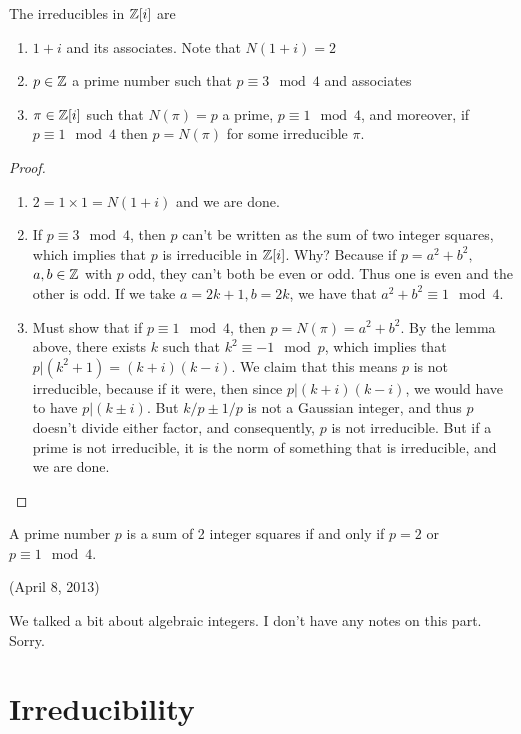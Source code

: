 \documentclass{../mathnotes}
\begin{document}
\begin{thm}
    The irreducibles in $\mathbb{Z}[i]$ are
    \begin{enumerate}
        \item $1+i$ and its associates. Note that $N(1+i)=2$
        \item $p\in\mathbb{Z}$ a prime number such that $p\equiv3\mod 4$ and associates
        \item $\pi\in\mathbb{Z}[i]$ such that $N(\pi)=p$ a prime, $p\equiv 1\mod 4$, and moreover, if $p\equiv 1\mod 4$
            then $p=N(\pi)$ for some irreducible $\pi$.
    \end{enumerate}
\end{thm}
\begin{proof}
    \begin{enumerate}
        \item $2=1\times 1=N(1+i)$ and we are done.
        \item If $p\equiv 3\mod 4$, then $p$ can't be written as the sum of two integer squares, which implies that
            $p$ is irreducible in $\mathbb{Z}[i]$. Why? Because if $p=a^2+b^2,$ $a,b\in\mathbb{Z}$ with $p$ odd, they can't both be even
            or odd. Thus one is even and the other is odd. If we take $a=2k+1,b=2k$, we have that $a^2+b^2\equiv 1\mod 4$.
        \item Must show that if $p\equiv1\mod 4$, then $p=N(\pi)=a^2+b^2$. By the lemma above, there exists $k$ such that
            $k^2\equiv -1\mod p$, which implies that $p|(k^2+1)=(k+i)(k-i)$. We claim that this means $p$ is not irreducible, because
            if it were, then since $p|(k+i)(k-i)$, we would have to have $p|(k\pm i)$. But $k/p\pm1/p$ is not a Gaussian integer,
            and thus $p$ doesn't divide either factor, and consequently, $p$ is not irreducible. But if a prime is not irreducible,
            it is the norm of something that is irreducible, and we are done.
    \end{enumerate}
\end{proof}

\begin{cor}
    A prime number $p$ is a sum of 2 integer squares if and only if $p=2$ or $p\equiv 1\mod 4$.
\end{cor}

(April 8, 2013)

We talked a bit about algebraic integers. I don't have any notes on this part. Sorry.

\section{Irreducibility}
\end{document}
